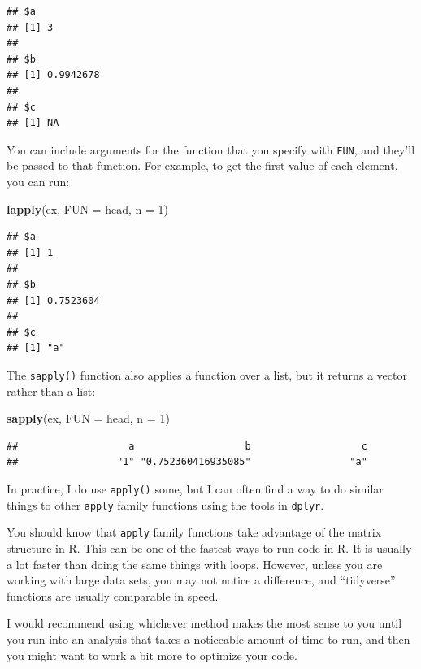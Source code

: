 \documentclass[]{book}
\makeatletter
\newenvironment{Shaded}{\begin{snugshade}}{\end{snugshade}}
\newcommand{\KeywordTok}[1]{\textcolor[rgb]{0.13,0.29,0.53}{\textbf{#1}}}
\newcommand{\DataTypeTok}[1]{\textcolor[rgb]{0.13,0.29,0.53}{#1}}
\newcommand{\DecValTok}[1]{\textcolor[rgb]{0.00,0.00,0.81}{#1}}
\newcommand{\NormalTok}[1]{#1}
\newenvironment{kframe}{%
\medskip{}
\setlength{\fboxsep}{.8em}
 \def\at@end@of@kframe{}%
 \ifinner\ifhmode%
  \def\at@end@of@kframe{\end{minipage}}%
  \begin{minipage}{\columnwidth}%
 \fi\fi%
 \def\FrameCommand##1{\hskip\@totalleftmargin \hskip-\fboxsep
 \colorbox{shadecolor}{##1}\hskip-\fboxsep
     \hskip-\linewidth \hskip-\@totalleftmargin \hskip\columnwidth}%
 \MakeFramed {\advance\hsize-\width
   \@totalleftmargin\z@ \linewidth\hsize
   \@setminipage}}%
 {\par\unskip\endMakeFramed%
 \at@end@of@kframe}
\renewenvironment{Shaded}{\begin{kframe}}{\end{kframe}}
\theoremstyle{definition}
\theoremstyle{definition}
\theoremstyle{definition}
\theoremstyle{remark}
\makeatother
\begin{document}
\begin{verbatim}
## $a
## [1] 3
## 
## $b
## [1] 0.9942678
## 
## $c
## [1] NA
\end{verbatim}

You can include arguments for the function that you specify with
\texttt{FUN}, and they'll be passed to that function. For example, to
get the first value of each element, you can run:

\begin{Shaded}
\begin{Highlighting}[]
\KeywordTok{lapply}\NormalTok{(ex, }\DataTypeTok{FUN =}\NormalTok{ head, }\DataTypeTok{n =} \DecValTok{1}\NormalTok{)}
\end{Highlighting}
\end{Shaded}

\begin{verbatim}
## $a
## [1] 1
## 
## $b
## [1] 0.7523604
## 
## $c
## [1] "a"
\end{verbatim}

The \texttt{sapply()} function also applies a function over a list, but
it returns a vector rather than a list:

\begin{Shaded}
\begin{Highlighting}[]
\KeywordTok{sapply}\NormalTok{(ex, }\DataTypeTok{FUN =}\NormalTok{ head, }\DataTypeTok{n =} \DecValTok{1}\NormalTok{)}
\end{Highlighting}
\end{Shaded}

\begin{verbatim}
##                   a                   b                   c 
##                 "1" "0.752360416935085"                 "a"
\end{verbatim}

In practice, I do use \texttt{apply()} some, but I can often find a way
to do similar things to other \texttt{apply} family functions using the
tools in \texttt{dplyr}. \bigskip

You should know that \texttt{apply} family functions take advantage of
the matrix structure in R. This can be one of the fastest ways to run
code in R. It is usually a lot faster than doing the same things with
loops. However, unless you are working with large data sets, you may not
notice a difference, and ``tidyverse'' functions are usually comparable
in speed. \bigskip

I would recommend using whichever method makes the most sense to you
until you run into an analysis that takes a noticeable amount of time to
run, and then you might want to work a bit more to optimize your code.
\bigskip
\end{document}
